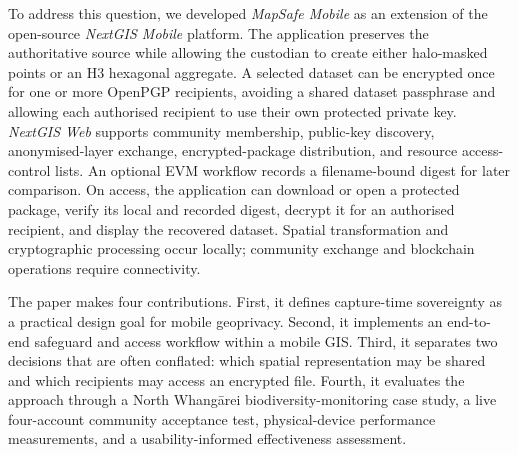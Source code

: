 \documentclass[]{interact}
\begin{document}
To address this question, we developed \textit{MapSafe Mobile} as an extension of the open-source \textit{NextGIS Mobile} platform. The application preserves the authoritative source while allowing the custodian to create either halo-masked points or an H3 hexagonal aggregate. A selected dataset can be encrypted once for one or more OpenPGP recipients, avoiding a shared dataset passphrase and allowing each authorised recipient to use their own protected private key. \textit{NextGIS Web} supports community membership, public-key discovery, anonymised-layer exchange, encrypted-package distribution, and resource access-control lists. An optional EVM workflow records a filename-bound digest for later comparison. On access, the application can download or open a protected package, verify its local and recorded digest, decrypt it for an authorised recipient, and display the recovered dataset. Spatial transformation and cryptographic processing occur locally; community exchange and blockchain operations require connectivity.

The paper makes four contributions. First, it defines capture-time sovereignty as a practical design goal for mobile geoprivacy. Second, it implements an end-to-end safeguard and access workflow within a mobile GIS. Third, it separates two decisions that are often conflated: which spatial representation may be shared and which recipients may access an encrypted file. Fourth, it evaluates the approach through a North Whang\={a}rei biodiversity-monitoring case study, a live four-account community acceptance test, physical-device performance measurements, and a usability-informed effectiveness assessment.



\end{document}
